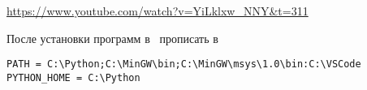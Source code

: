 \clearpage
{}

\url{https://www.youtube.com/watch?v=YiLklxw_NNY&t=311}

\bigskip
\noindent
После установки программ в \win\ прописать в
\\

\medskip
{}
\begin{verbatim}
PATH = C:\Python;C:\MinGW\bin;C:\MinGW\msys\1.0\bin:C:\VSCode
PYTHON_HOME = C:\Python
\end{verbatim}
